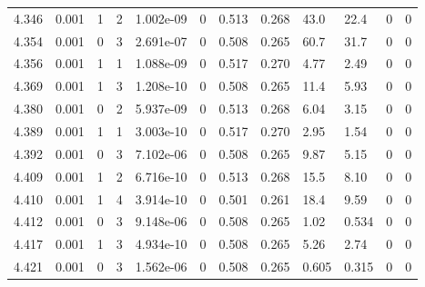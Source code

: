 \documentclass[preview]{standalone}
\begin{document}
{{{{{{{{{{{\begin{tabular}{L{1.2cm}C{1.2cm} C{0.3cm}C{0.5cm} C{1.4cm}C{1.4cm} C{1.4cm}C{1.4cm} C{1.6cm}C{1.6cm} C{1.6cm}C{1.6cm}}
  4.346  &  0.001  & 1     &  2 &  1.002e-09  & 0  &  0.513&   0.268& 43.0 & 22.4   &  0 & 0  \\ 
  4.354  &  0.001  & 0     &  3 &  2.691e-07  & 0  &  0.508&   0.265& 60.7 & 31.7   &  0 & 0  \\ 
  4.356  &  0.001  & 1     &  1 &  1.088e-09  & 0  &  0.517&   0.270& 4.77 & 2.49   &  0 & 0  \\ 
  4.369  &  0.001  & 1     &  3 &  1.208e-10  & 0  &  0.508&   0.265& 11.4 & 5.93   &  0 & 0  \\ 
  4.380  &  0.001  & 0     &  2 &  5.937e-09  & 0  &  0.513&   0.268& 6.04 & 3.15   &  0 & 0  \\ 
  4.389  &  0.001  & 1     &  1 &  3.003e-10  & 0  &  0.517&   0.270& 2.95 & 1.54   &  0 & 0  \\ 
  4.392  &  0.001  & 0     &  3 &  7.102e-06  & 0  &  0.508&   0.265& 9.87 & 5.15   &  0 & 0  \\ 
  4.409  &  0.001  & 1     &  2 &  6.716e-10  & 0  &  0.513&   0.268& 15.5 & 8.10   &  0 & 0  \\ 
  4.410  &  0.001  & 1     &  4 &  3.914e-10  & 0  &  0.501&   0.261& 18.4 & 9.59   &  0 & 0  \\ 
  4.412  &  0.001  & 0     &  3 &  9.148e-06  & 0  &  0.508&   0.265& 1.02 & 0.534   &  0 & 0  \\ 
  4.417  &  0.001  & 1     &  3 &  4.934e-10  & 0  &  0.508&   0.265& 5.26 & 2.74   &  0 & 0  \\ 
  4.421  &  0.001  & 0     &  3 &  1.562e-06  & 0  &  0.508&   0.265& 0.605 & 0.315   &  0 & 0  \\ 
\hline 
\end{tabular} 

}}}}}}}}}}}
\end{document}
